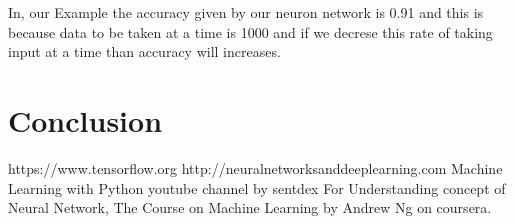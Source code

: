 \documentclass[journal, a4paper]{IEEEtran}
\begin{document}
	In, our Example the accuracy given by our neuron network is 0.91 and this is because data to be taken at a time is 1000 and if we decrese this rate of taking input at a time than accuracy will increases.
	
\section{Conclusion}
	

\begin{thebibliography}{9}
	https://www.tensorflow.org
	http://neuralnetworksanddeeplearning.com
	Machine Learning with Python youtube channel by sentdex
	For Understanding concept of Neural Network, The Course on Machine Learning by Andrew Ng on coursera. 
		
		
\end{thebibliography}



\end{document}
